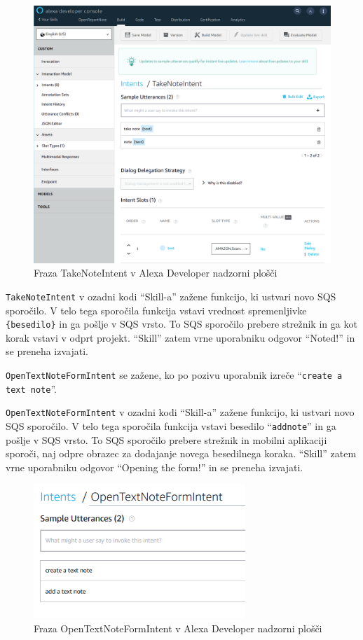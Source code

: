 \documentclass[a4paper, 12pt]{book}
\begin{document}
\begin{figure}[H]
\begin{center}
\includegraphics[width=13cm]{intent_literal}
\end{center}
\caption{Fraza TakeNoteIntent v Alexa Developer nadzorni plošči}
\label{TakeNoteIntent}
\end{figure}

\texttt{TakeNoteIntent} v ozadni kodi \enquote{Skill-a} zažene funkcijo, ki ustvari novo SQS sporočilo.
V telo tega sporočila funkcija vstavi vrednost spremenljivke \texttt{\{besedilo\}} in ga pošlje v SQS vrsto.
To SQS sporočilo prebere strežnik in ga kot korak vstavi v odprt projekt.
\enquote{Skill} zatem vrne uporabniku odgovor \enquote{Noted!} in se preneha izvajati.

\texttt{OpenTextNoteFormIntent} se zažene, ko po pozivu uporabnik izreče \enquote{\texttt{create a text note}}.

\texttt{OpenTextNoteFormIntent} v ozadni kodi \enquote{Skill-a} zažene funkcijo, ki ustvari novo SQS sporočilo.
V telo tega sporočila funkcija vstavi besedilo \enquote{\texttt{addnote}} in ga pošlje v SQS vrsto.
To SQS sporočilo prebere strežnik in mobilni aplikaciji sporoči, naj odpre obrazec za dodajanje novega besedilnega koraka.
\enquote{Skill} zatem vrne uporabniku odgovor \enquote{Opening the form!} in se preneha izvajati.


\begin{figure}[H]
\begin{center}
\includegraphics[width=8cm]{intent_text}
\end{center}
\caption{Fraza OpenTextNoteFormIntent v Alexa Developer nadzorni plošči}
\label{OpenTextNoteFormIntent}
\end{figure}
\end{document}
